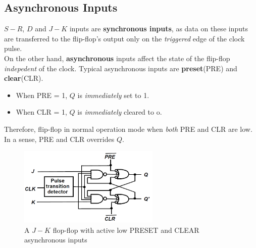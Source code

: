 \documentclass[12pt]{article}
\theoremstyle{definition}
\begin{document}
\subsection{Asynchronous Inputs}
$S-R$, $D$ and $J-K$ inputs are \textbf{synchronous inputs}, as data on these inputs are transferred to the flip-flop's output only on the \textit{triggered} edge of the clock pulse.\\On the other hand, \textbf{asynchronous} inputs affect the state of the flip-flop \textit{indepedent} of the clock. Typical asynchronous inputs are \textbf{preset}(PRE) and \textbf{clear}(CLR).
\begin{itemize}
  \item When PRE = 1, $Q$ is \textit{immediately} set to 1.
  \item When CLR = 1, $Q$ is \textit{immediately} cleared to o.
\end{itemize}
Therefore, flip-flop in normal operation mode when \textit{both} PRE and CLR are low.\\In a sense, PRE and CLR overrides $Q$.\clearpage
\begin{figure}[h]
\centering
\includegraphics[width = 0.6\textwidth]{8_10.png}
\caption{A $J-K$ flop-flop with active low PRESET and CLEAR asynchronous inputs}
\end{figure}
\end{document}
